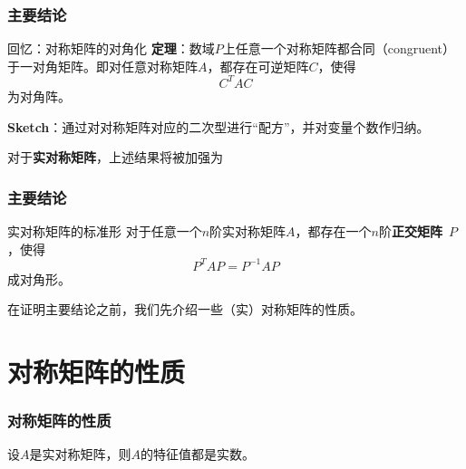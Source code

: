
\begin{frame}
\frametitle{主要结论}

\begin{block}{回忆：对称矩阵的对角化}
{\bfseries 定理}：数域$P$上任意一个对称矩阵都合同（congruent）于一对角矩阵。即对任意对称矩阵$A$，都存在可逆矩阵$C$，使得
\[C^TAC\]
为对角阵。

\vspace{1em}
\pause

{\bfseries Sketch}：通过对对称矩阵对应的二次型进行``配方''，并对变量个数作归纳。
\end{block}

\vspace{1em}
\pause

对于{\bfseries 实对称矩阵}，上述结果将被加强为

\end{frame}


\begin{frame}
\frametitle{主要结论}

\begin{block}{实对称矩阵的标准形}
对于任意一个$n$阶实对称矩阵$A$，都存在一个$n$阶{\bfseries 正交矩阵}~$P$，使得
\[P^TAP = P^{-1}AP\]
成对角形。
\end{block}

\vspace{1em}
\pause

在证明主要结论之前，我们先介绍一些（实）对称矩阵的性质。

\end{frame}


\section{对称矩阵的性质}


\begin{frame}
\frametitle{对称矩阵的性质}

\begin{lem}
设$A$是实对称矩阵，则$A$的特征值都是实数。
\end{lem}

\end{frame}

